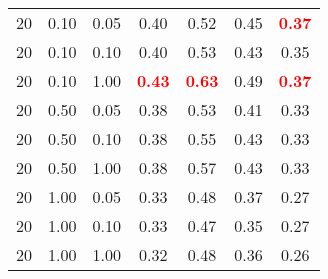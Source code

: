 \begin{tabular}{lllcccc}
20 & 0.10 & 0.05 & 0.40 & 0.52 & 0.45 & \textbf{\textcolor{red}{0.37}} \\ 
20 & 0.10 & 0.10 & 0.40 & 0.53 & 0.43 & 0.35 \\ 
20 & 0.10 & 1.00 & \textbf{\textcolor{red}{0.43}} & \textbf{\textcolor{red}{0.63}} & 0.49 & \textbf{\textcolor{red}{0.37}} \\ 
20 & 0.50 & 0.05 & 0.38 & 0.53 & 0.41 & 0.33 \\ 
20 & 0.50 & 0.10 & 0.38 & 0.55 & 0.43 & 0.33 \\ 
20 & 0.50 & 1.00 & 0.38 & 0.57 & 0.43 & 0.33 \\ 
20 & 1.00 & 0.05 & 0.33 & 0.48 & 0.37 & 0.27 \\ 
20 & 1.00 & 0.10 & 0.33 & 0.47 & 0.35 & 0.27 \\ 
20 & 1.00 & 1.00 & 0.32 & 0.48 & 0.36 & 0.26 \\ 
\end{tabular} 
